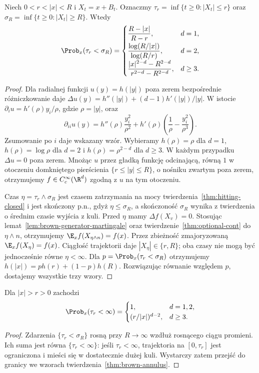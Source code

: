 \begin{twierdzenie}
\label{thm:brown-annulus}
Niech $0<r<|x|<R$ i $X_t=x+B_t$. Oznaczmy
$\tau_r=\inf\{t\ge0:|X_t|\le r\}$ oraz
$\sigma_R=\inf\{t\ge0:|X_t|\ge R\}$.
Wtedy
\[
\Prob_x(\tau_r<\sigma_R)=
\begin{cases}
\dfrac{R-|x|}{R-r},&d=1,\\[6pt]
\dfrac{\log(R/|x|)}{\log(R/r)},&d=2,\\[6pt]
\dfrac{|x|^{2-d}-R^{2-d}}{r^{2-d}-R^{2-d}},&d\ge3.
\end{cases}
\]
\end{twierdzenie}
\begin{proof}
Dla radialnej funkcji $u(y)=h(|y|)$ poza zerem
bezpośrednie różniczkowanie daje
$\Delta u(y)=h''(|y|)+(d-1)h'(|y|)/|y|$.
W istocie $\partial_i u=h'(\rho)y_i/\rho$,
gdzie $\rho=|y|$, oraz
\[
\partial_{ii}u(y)=h''(\rho)\frac{y_i^2}{\rho^2}
+h'(\rho)\left(\frac1\rho-\frac{y_i^2}{\rho^3}\right).
\]
Zsumowanie po $i$ daje wskazany wzór. Wybieramy $h(\rho)=\rho$
dla $d=1$, $h(\rho)=\log\rho$ dla $d=2$ i
$h(\rho)=\rho^{2-d}$ dla $d\ge3$.
W każdym przypadku $\Delta u=0$ poza zerem.
Mnożąc $u$ przez gładką funkcję odcinającą,
równą $1$ w otoczeniu domkniętego pierścienia
$\{r\le |y|\le R\}$, o nośniku zwartym poza zerem,
otrzymujemy $f\in C_c^\infty(\R^d)$ zgodną z $u$
na tym otoczeniu.

Czas $\eta=\tau_r\wedge\sigma_R$ jest czasem
zatrzymania na mocy twierdzenia~\ref{thm:hitting-closed}
i jest skończony p.n., gdyż $\eta\le\sigma_R$,
a skończoność $\sigma_R$ wynika z twierdzenia
o średnim czasie wyjścia z kuli.
Przed $\eta$ mamy $\Delta f(X_v)=0$.
Stosując lemat~\ref{lem:brown-generator-martingale}
oraz twierdzenie~\ref{thm:optional-cont} do
$\eta\wedge n$, otrzymujemy $\E_x f(X_{\eta\wedge n})=f(x)$.
Przez zbieżność zmajoryzowaną
$\E_x f(X_\eta)=f(x)$. Ciągłość trajektorii daje
$|X_\eta|\in\{r,R\}$; oba czasy nie mogą być
jednocześnie równe $\eta<\infty$.
Dla $p=\Prob_x(\tau_r<\sigma_R)$ otrzymujemy
$h(|x|)=p h(r)+(1-p)h(R)$.
Rozwiązując równanie względem $p$, dostajemy wszystkie
trzy wzory.
\end{proof}

\begin{wniosek}
Dla $|x|>r>0$ zachodzi
\[
\Prob_x(\tau_r<\infty)=
\begin{cases}
1,&d=1,2,\\
(r/|x|)^{d-2},&d\ge3.
\end{cases}
\]
\end{wniosek}
\begin{proof}
Zdarzenia $\{\tau_r<\sigma_R\}$ rosną przy
$R\to\infty$ wzdłuż rosnącego ciągu promieni.
Ich suma jest równa $\{\tau_r<\infty\}$:
jeśli $\tau_r<\infty$, trajektoria na $[0,\tau_r]$
jest ograniczona i mieści się w dostatecznie dużej
kuli. Wystarczy zatem przejść do granicy we
wzorach twierdzenia~\ref{thm:brown-annulus}.
\end{proof}

